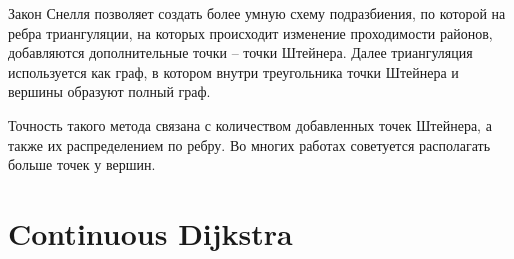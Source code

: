 Закон Снелля позволяет создать более умную схему подразбиения, по которой
на ребра триангуляции, на которых происходит изменение проходимости районов,
добавляются дополнительные точки -- точки Штейнера. Далее триангуляция
используется как граф, в котором внутри треугольника точки Штейнера и вершины
образуют полный граф.

Точность такого метода связана с количеством добавленных точек Штейнера, а
также их распределением по ребру. Во многих работах советуется располагать
больше точек у вершин.



\section{Continuous Dijkstra}
